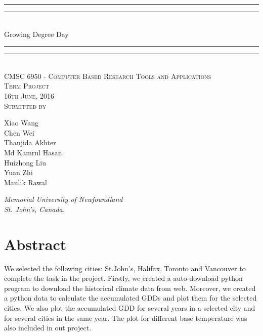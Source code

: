 \documentclass[12pt]{article}
\begin{document}
{\centering

\rule{\textwidth}{1.6pt}\vspace*{-\baselineskip}\vspace*{2pt} 
\rule{\textwidth}{0.4pt}\\[\baselineskip] 
{\LARGE Growing Degree Day}
\rule{\textwidth}{0.4pt}\vspace*{-\baselineskip}\vspace{3.2pt}
\rule{\textwidth}{1.6pt}\\[\baselineskip] 

\vspace{20mm} %
\scshape %
CMSC 6950 - Computer Based Research Tools and Applications \\ [\baselineskip]
Term Project \\[\baselineskip] 
16th June, 2016 \\[\baselineskip] 
\vspace{20mm} %
Submitted by \\[\baselineskip]
{\Large Xiao Wang\\Chen Wei \\Thanjida Akhter \\ Md Kamrul Hasan \\ Huizhong Liu \\ Yuan Zhi\\Maulik Rawal \par}
\vfill
{\itshape Memorial University of Newfoundland \\ St. John's, Canada.\par} 
}

\newpage

{\centering
  \section*{Abstract}
}

We selected the following cities: St.John's, Halifax, Toronto and Vancouver to complete the task in the project. Firstly, we created a auto-download python program to download the historical climate data from web. Moreover, we created a python data to calculate the accumulated GDDs and plot them for the selected cities. We also plot the accumulated GDD for several years in a selected city and for several cities in the same year. The plot for different base temperature was also included in out project. \\
\end{document}
